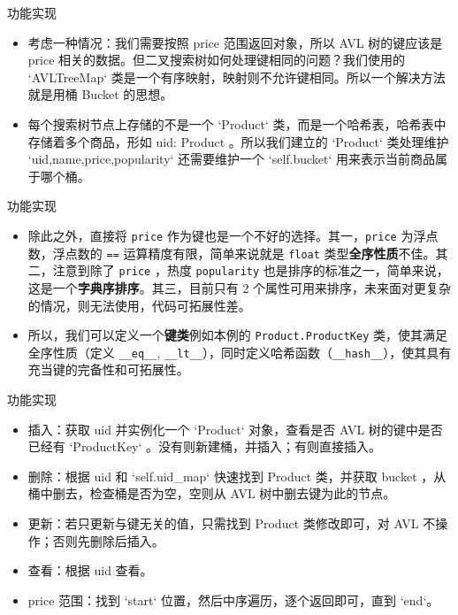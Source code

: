 \documentclass{beamer}
\begin{document}
\begin{frame}{功能实现}
\begin{itemize}
\item 考虑一种情况：我们需要按照 price 范围返回对象，所以 AVL 树的键应该是 price 相关的数据。但二叉搜索树如何处理键相同的问题？我们使用的 `AVLTreeMap` 类是一个有序映射，映射则不允许键相同。所以一个解决方法就是用桶 Bucket 的思想。
\item 每个搜索树节点上存储的不是一个 `Product` 类，而是一个哈希表，哈希表中存储着多个商品，形如 uid: Product 。所以我们建立的 `Product` 类处理维护 `uid,name,price,popularity` 还需要维护一个 `self.bucket` 用来表示当前商品属于哪个桶。
\end{itemize}
\end{frame}

\begin{frame}{功能实现}
\begin{itemize}
\item 除此之外，直接将 \texttt{price} 作为键也是一个不好的选择。其一，\texttt{price} 为浮点数，浮点数的 \texttt{==} 运算精度有限，简单来说就是 \texttt{float} 类型\textbf{全序性质}不佳。其二，注意到除了 \texttt{price} ，热度 \texttt{popularity} 也是排序的标准之一，简单来说，这是一个\textbf{字典序排序}。其三，目前只有 2 个属性可用来排序，未来面对更复杂的情况，则无法使用，代码可拓展性差。
\item 所以，我们可以定义一个\textbf{键类}例如本例的 \texttt{Product.ProductKey} 类，使其满足全序性质（定义 \texttt{\_\_eq\_\_}, \texttt{\_\_lt\_\_}），同时定义哈希函数（\texttt{\_\_hash\_\_}），使其具有充当键的完备性和可拓展性。
\end{itemize}
\end{frame}


\begin{frame}{功能实现}
\begin{itemize}
\item 插入：获取 uid 并实例化一个 `Product` 对象，查看是否 AVL 树的键中是否已经有 `ProductKey` 。没有则新建桶，并插入；有则直接插入。
\item 删除：根据 uid 和 `self.uid\_map` 快速找到 Product 类，并获取 bucket ，从桶中删去，检查桶是否为空，空则从 AVL 树中删去键为此的节点。
\item 更新：若只更新与键无关的值，只需找到 Product 类修改即可，对 AVL 不操作；否则先删除后插入。
\item 查看：根据 uid 查看。
\item price 范围：找到 `start` 位置，然后中序遍历，逐个返回即可，直到 `end`。
\end{itemize}
\end{frame}
\end{document}
